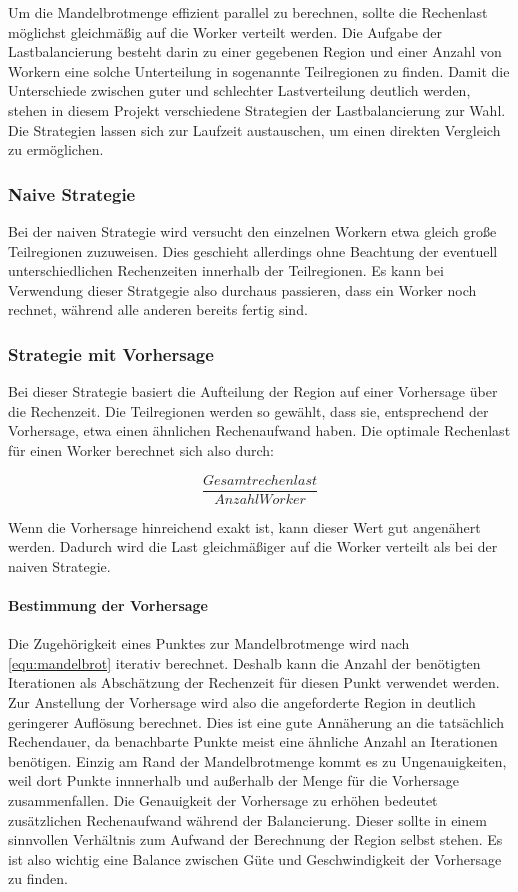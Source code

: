 Um die Mandelbrotmenge effizient parallel zu berechnen, sollte die Rechenlast möglichst gleichmäßig auf die Worker verteilt werden.
Die Aufgabe der Lastbalancierung besteht darin zu einer gegebenen Region und einer Anzahl von Workern eine solche Unterteilung in sogenannte Teilregionen zu finden.
Damit die Unterschiede zwischen guter und schlechter Lastverteilung deutlich werden, stehen in diesem Projekt verschiedene Strategien der Lastbalancierung zur Wahl.
Die Strategien lassen sich zur Laufzeit austauschen, um einen direkten Vergleich zu ermöglichen.

\subsubsection{Naive Strategie}

Bei der naiven Strategie wird versucht den einzelnen Workern etwa gleich große Teilregionen zuzuweisen.
Dies geschieht allerdings ohne Beachtung der eventuell unterschiedlichen Rechenzeiten innerhalb der Teilregionen.
Es kann bei Verwendung dieser Stratgegie also durchaus passieren, dass ein Worker noch rechnet, während alle anderen bereits fertig sind.

\subsubsection{Strategie mit Vorhersage}

Bei dieser Strategie basiert die Aufteilung der Region auf einer Vorhersage über die Rechenzeit.
Die Teilregionen werden so gewählt, dass sie, entsprechend der Vorhersage, etwa einen ähnlichen Rechenaufwand haben.
Die optimale Rechenlast für einen Worker berechnet sich also durch:

\begin{equation*}
	\frac{Gesamtrechenlast}{AnzahlWorker}
\end{equation*}

Wenn die Vorhersage hinreichend exakt ist, kann dieser Wert gut angenähert werden.
Dadurch wird die Last gleichmäßiger auf die Worker verteilt als bei der naiven Strategie.

\paragraph*{Bestimmung der Vorhersage}

Die Zugehörigkeit eines Punktes zur Mandelbrotmenge wird nach \autoref{equ:mandelbrot} iterativ berechnet.
Deshalb kann die Anzahl der benötigten Iterationen als Abschätzung der Rechenzeit für diesen Punkt verwendet werden.
Zur Anstellung der Vorhersage wird also die angeforderte Region in deutlich geringerer Auflösung berechnet.
Dies ist eine gute Annäherung an die tatsächlich Rechendauer, da benachbarte Punkte meist eine ähnliche Anzahl an Iterationen benötigen.
Einzig am Rand der Mandelbrotmenge kommt es zu Ungenauigkeiten, weil dort Punkte innnerhalb und außerhalb der Menge für die Vorhersage zusammenfallen.
Die Genauigkeit der Vorhersage zu erhöhen bedeutet zusätzlichen Rechenaufwand während der Balancierung.
Dieser sollte in einem sinnvollen Verhältnis zum Aufwand der Berechnung der Region selbst stehen.
Es ist also wichtig eine Balance zwischen Güte und Geschwindigkeit der Vorhersage zu finden.

